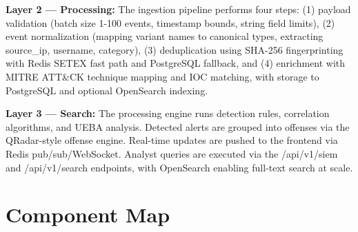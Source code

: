 \noindent\textbf{Layer 2 — Processing:} The ingestion pipeline performs four steps: (1) payload validation (batch size 1-100 events, timestamp bounds, string field limits), (2) event normalization (mapping variant names to canonical types, extracting source\_ip, username, category), (3) deduplication using SHA-256 fingerprinting with Redis SETEX fast path and PostgreSQL fallback, and (4) enrichment with MITRE ATT\&CK technique mapping and IOC matching, with storage to PostgreSQL and optional OpenSearch indexing.

\noindent\textbf{Layer 3 — Search:} The processing engine runs detection rules, correlation algorithms, and UEBA analysis. Detected alerts are grouped into offenses via the QRadar-style offense engine. Real-time updates are pushed to the frontend via Redis pub/sub/WebSocket. Analyst queries are executed via the /api/v1/siem and /api/v1/search endpoints, with OpenSearch enabling full-text search at scale.

\section{Component Map}

